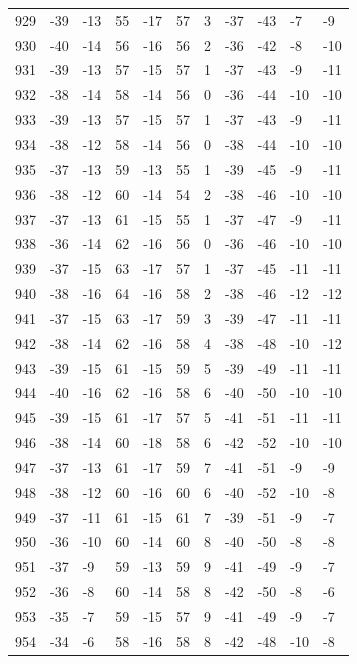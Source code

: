 \begin{table}[H]
\begin{tabular}{lllllllllll}
929 & -39 & -13 & 55 & -17 & 57 & 3 & -37 & -43 & -7 & -9 \\
930 & -40 & -14 & 56 & -16 & 56 & 2 & -36 & -42 & -8 & -10 \\
931 & -39 & -13 & 57 & -15 & 57 & 1 & -37 & -43 & -9 & -11 \\
932 & -38 & -14 & 58 & -14 & 56 & 0 & -36 & -44 & -10 & -10 \\
933 & -39 & -13 & 57 & -15 & 57 & 1 & -37 & -43 & -9 & -11 \\
934 & -38 & -12 & 58 & -14 & 56 & 0 & -38 & -44 & -10 & -10 \\
935 & -37 & -13 & 59 & -13 & 55 & 1 & -39 & -45 & -9 & -11 \\
936 & -38 & -12 & 60 & -14 & 54 & 2 & -38 & -46 & -10 & -10 \\
937 & -37 & -13 & 61 & -15 & 55 & 1 & -37 & -47 & -9 & -11 \\
938 & -36 & -14 & 62 & -16 & 56 & 0 & -36 & -46 & -10 & -10 \\
939 & -37 & -15 & 63 & -17 & 57 & 1 & -37 & -45 & -11 & -11 \\
940 & -38 & -16 & 64 & -16 & 58 & 2 & -38 & -46 & -12 & -12 \\
941 & -37 & -15 & 63 & -17 & 59 & 3 & -39 & -47 & -11 & -11 \\
942 & -38 & -14 & 62 & -16 & 58 & 4 & -38 & -48 & -10 & -12 \\
943 & -39 & -15 & 61 & -15 & 59 & 5 & -39 & -49 & -11 & -11 \\
944 & -40 & -16 & 62 & -16 & 58 & 6 & -40 & -50 & -10 & -10 \\
945 & -39 & -15 & 61 & -17 & 57 & 5 & -41 & -51 & -11 & -11 \\
946 & -38 & -14 & 60 & -18 & 58 & 6 & -42 & -52 & -10 & -10 \\
947 & -37 & -13 & 61 & -17 & 59 & 7 & -41 & -51 & -9 & -9 \\
948 & -38 & -12 & 60 & -16 & 60 & 6 & -40 & -52 & -10 & -8 \\
949 & -37 & -11 & 61 & -15 & 61 & 7 & -39 & -51 & -9 & -7 \\
950 & -36 & -10 & 60 & -14 & 60 & 8 & -40 & -50 & -8 & -8 \\
951 & -37 & -9 & 59 & -13 & 59 & 9 & -41 & -49 & -9 & -7 \\
952 & -36 & -8 & 60 & -14 & 58 & 8 & -42 & -50 & -8 & -6 \\
953 & -35 & -7 & 59 & -15 & 57 & 9 & -41 & -49 & -9 & -7 \\
954 & -34 & -6 & 58 & -16 & 58 & 8 & -42 & -48 & -10 & -8 \\

\end{tabular}
\end{table}
